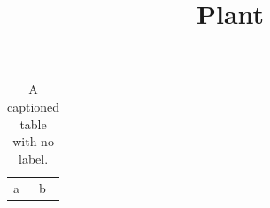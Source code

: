\documentclass[article]{jss}
\title{Plant}
\begin{document}
\begin{table}
\begin{tabular}{ll} a & b \end{tabular}
\caption{A captioned table with no label.}
\end{table}
\end{document}
